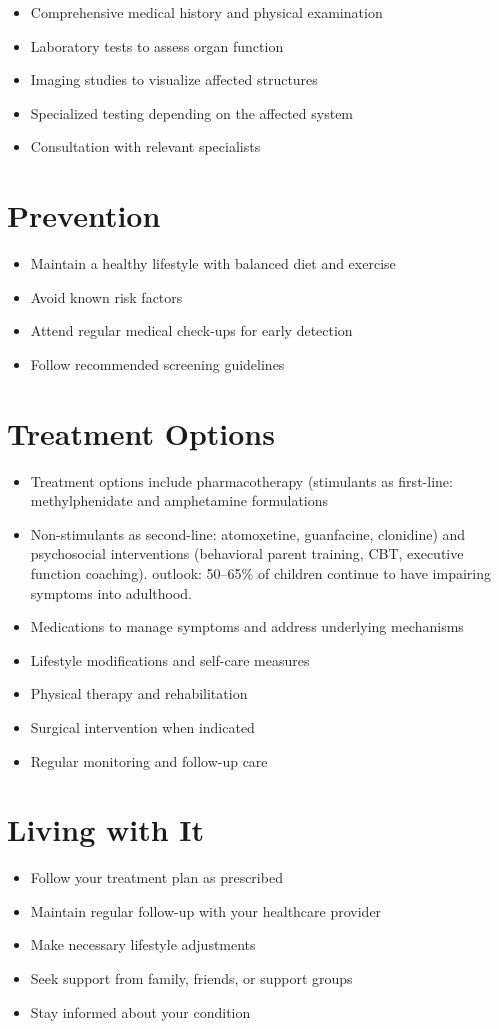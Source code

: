 \begin{itemize}[noitemsep]
  \item Comprehensive medical history and physical examination
  \item Laboratory tests to assess organ function
  \item Imaging studies to visualize affected structures
  \item Specialized testing depending on the affected system
  \item Consultation with relevant specialists
\end{itemize}
\section{Prevention}
\begin{itemize}[noitemsep]
  \item Maintain a healthy lifestyle with balanced diet and exercise
  \item Avoid known risk factors
  \item Attend regular medical check-ups for early detection
  \item Follow recommended screening guidelines
\end{itemize}
\section{Treatment Options}
\begin{itemize}[noitemsep]
  \item Treatment options include pharmacotherapy (stimulants as first-line: methylphenidate and amphetamine formulations
  \item Non-stimulants as second-line: atomoxetine, guanfacine, clonidine) and psychosocial interventions (behavioral parent training, CBT, executive function coaching). outlook: 50--65\% of children continue to have impairing symptoms into adulthood.
  \item Medications to manage symptoms and address underlying mechanisms
  \item Lifestyle modifications and self-care measures
  \item Physical therapy and rehabilitation
  \item Surgical intervention when indicated
  \item Regular monitoring and follow-up care
\end{itemize}
\section{Living with It}
\begin{itemize}[noitemsep]
  \item Follow your treatment plan as prescribed
  \item Maintain regular follow-up with your healthcare provider
  \item Make necessary lifestyle adjustments
  \item Seek support from family, friends, or support groups
  \item Stay informed about your condition
\end{itemize}
